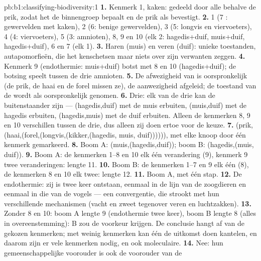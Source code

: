 \begin{solution}{pb:b1:classifying-biodiversity:1}
\textbf{1.} Kenmerk 1, kaken: gedeeld door alle  behalve de prik, zodat
het de binnengroep bepaalt en de prik als  bevestigt.
\textbf{2.} 1 (7 : gewervelden met kaken), 2 (6: benige gewervelden), 3
(5: longvis en viervoeters), 4 (4: viervoeters), 5 (3: amnioten), 8, 9
en 10 (elk 2: hagedis+duif, muis+duif, hagedis+duif), 6 en 7
(elk 1).
\textbf{3.} Haren (muis) en veren (duif): unieke toestanden,
autapomorfieën, die het  kenschetsen maar niets over zijn verwanten
zeggen.
\textbf{4.} Kenmerk 9 (endothermie: muis+duif) botst met 8 en 10
(hagedis+duif); de botsing speelt tussen de drie amnioten.
\textbf{5.} De afwezigheid van  is oorspronkelijk (de prik, de haai en
de forel missen ze), de aanwezigheid afgeleid; de toestand van de
 wordt als oorspronkelijk genomen.
\textbf{6.} Drie: elk van de drie kan de buitenstaander zijn ---
(hagedis,duif) met de muis erbuiten, (muis,duif) met de hagedis erbuiten,
(hagedis,muis) met de duif erbuiten. Alleen de kenmerken 8, 9 en 10
verschillen tussen de drie, dus alleen zij doen ertoe voor de keuze.
\textbf{7.} (prik,(haai,(forel,(longvis,(kikker,(hagedis, muis,
duif)))))), met elke knoop door één kenmerk gemarkeerd.
\textbf{8.} Boom A: (muis,(hagedis,duif)); boom B: (hagedis,(muis,
duif)).
\textbf{9.} Boom A: de kenmerken 1--8 en 10 elk één verandering (9), kenmerk
9 twee veranderingen: lengte \num{11}.
\textbf{10.} Boom B: de kenmerken 1--7 en 9 elk één (8), de kenmerken 8 en
10 elk twee: lengte \num{12}.
\textbf{11.} Boom A, met één stap.
\textbf{12.} De endothermie: zij is twee keer ontstaan, eenmaal in de lijn van
de zoogdieren en eenmaal in die van de vogels --- een convergentie, die
strookt met hun verschillende mechanismen (vacht en zweet tegenover veren en
luchtzakken).
\textbf{13.} Zonder 8 en 10: boom A lengte 9 (endothermie twee keer), boom B
lengte 8 (alles in overeenstemming): B zou de voorkeur krijgen. De conclusie
hangt af van de gekozen kenmerken; met weinig kenmerken kan één  de
uitkomst doen kantelen, en daarom zijn er vele kenmerken nodig, en ook
moleculaire.
\textbf{14.} Nee: hun gemeenschappelijke voorouder is ook de voorouder van de

\end{solution}
